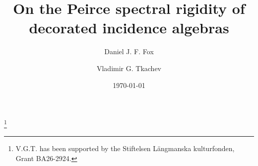 \documentclass[times,11pt,reqno]{amsproc}
\theoremstyle{definition}
\numberwithin{equation}{section}
\begin{document}
\title[Peirce spectral rigidity of decorated incidence algebras]
 {On the Peirce spectral rigidity of decorated incidence algebras}

\author[D.~J.~F.~Fox]{Daniel J. F. Fox}
\address{Departamento de Matem\'atica Aplicada, Escuela T\'ecnica Superior de Arquitectura, Universidad Polit\'ecnica de Madrid, Av. Juan de Herrera 4, 28040 Madrid, Spain}

\author[V.~G.~Tkachev]{Vladimir G. Tkachev}
\address{Department of Mathematics, Link\"oping University, 58183, Sweden}
\thanks{V.G.T. has been supported by the Stiftelsen L\"angmanska kulturfonden, Grant BA26-2924.}

%
%
\date{\today}
\end{document}
